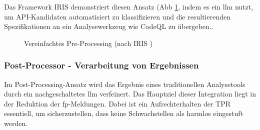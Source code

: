 \documentclass[%
    paper=A4,               %
    ngerman,
    parskip=half,           %
    11pt,                   %
    headings=normal,        %
    bibliography=totoc,     %
    listof=totoc,           %
    chapterprefix=false,    %
    appendixprefix=false,    %
    draft=false,            %
]{scrartcl}%
\begin{document}
Das Framework  IRIS demonstriert diesen Ansatz (Abb \ref{fig:pre_processing_pattern}, indem es ein \ac{llm} nutzt, um API-Kandidaten automatisiert zu klassifizieren und die resultierenden Spezifikationen an ein Analysewerkzeug wie CodeQL zu übergeben.\cite{liIRISLLMAssistedStatic2024}.

\begin{figure}[h]
\centering
\caption{Vereinfachtes Pre-Processing (nach IRIS \cite{liIRISLLMAssistedStatic2024})}
\label{fig:pre_processing_pattern}
\end{figure}

\subsubsection{Post-Processor - Verarbeitung von Ergebnissen}
Im Post-Processing-Ansatz wird das Ergebnis eines traditionellen Analysetools durch ein nachgeschaltetes \ac{llm} verfeinert\cite{wagnerEffectiveComplementarySecurity2025}. Das Hauptziel dieser Integration liegt in der Reduktion der \ac{fp}-Meldungen. Dabei ist ein Aufrechterhalten der \ac{TPR} essentiell, um sicherzustellen, dass keine Schwachstellen als harmlos eingestuft werden\cite{wagnerEffectiveComplementarySecurity2025}.
\end{document}
